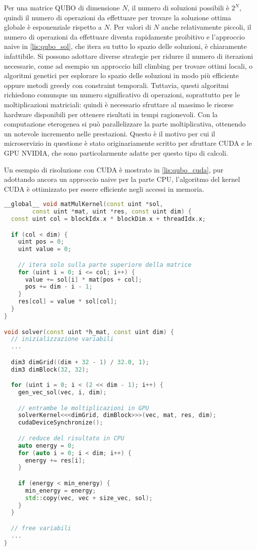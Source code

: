 Per una matrice QUBO di dimensione $N$, il numero di soluzioni possibili è $2^N$, quindi il numero di operazioni da effettuare per trovare la soluzione ottima globale è esponenziale rispetto a $N$. Per valori di $N$ anche relativamente piccoli, il numero di operazioni da effettuare diventa rapidamente proibitivo e l'approccio naive in \ref{lis:qubo_sol}, che itera su tutto lo spazio delle soluzioni, è chiaramente infattibile. 
Si possono adottare diverse strategie per ridurre il numero di iterazioni necessarie, come ad esempio un approccio hill climbing per trovare ottimi locali, o algoritmi genetici per esplorare lo spazio delle soluzioni in modo più efficiente oppure metodi greedy con constraint temporali. Tuttavia, questi algoritmi richiedono comunque un numero significativo di operazioni, soprattutto per le moltiplicazioni matriciali: quindi è necessario sfruttare al massimo le risorse hardware disponibili per ottenere risultati in tempi ragionevoli. Con la computazione eterogenea si può parallelizzare la parte moltiplicativa, ottenendo un notevole incremento nelle prestazioni. Questo è il motivo per cui il microservizio in questione è stato originariamente scritto per sfruttare CUDA e le GPU NVIDIA, che sono particolarmente adatte per questo tipo di calcoli.

Un esempio di risoluzione con CUDA è mostrato in \ref{lis:qubo_cuda}, pur adottando ancora un approccio naive per la parte CPU, l'algoritmo del kernel CUDA è ottimizzato per essere efficiente negli accessi in memoria.


\vspace{5mm}
\begin{lstlisting}[language=C++, caption=CUDA moltiplicazine matrice QUBO, label=lis:qubo_cuda]
__global__ void matMulKernel(const uint *sol, 
        const uint *mat, uint *res, const uint dim) {
  const uint col = blockIdx.x * blockDim.x + threadIdx.x;

  if (col < dim) {
    uint pos = 0;
    uint value = 0;

    // itera solo sulla parte superiore della matrice
    for (uint i = 0; i <= col; i++) {
      value += sol[i] * mat[pos + col];
      pos += dim - i - 1;
    }
    res[col] = value * sol[col];
  }
}

void solver(const uint *h_mat, const uint dim) {
  // inizializzazione variabili
  ... 

  dim3 dimGrid((dim + 32 - 1) / 32.0, 1);
  dim3 dimBlock(32, 32);

  for (uint i = 0; i < (2 << dim - 1); i++) {
    gen_vec_sol(vec, i, dim);

    // entrambe le moltiplicazioni in GPU
    solverKernel<<<dimGrid, dimBlock>>>(vec, mat, res, dim);
    cudaDeviceSynchronize();

    // reduce del risultato in CPU
    auto energy = 0;
    for (auto i = 0; i < dim; i++) {
      energy += res[i];
    }

    if (energy < min_energy) {
      min_energy = energy;
      std::copy(vec, vec + size_vec, sol);
    }
  }

  // free variabili
  ...
}
\end{lstlisting}
\vspace{5mm}


